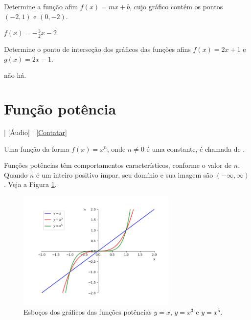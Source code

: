 \begin{ex}
  Determine a função afim $f(x)=mx+b$, cujo gráfico contém os pontos $(-2, 1)$ e $(0, -2)$.
\end{ex}
\begin{resp}
  $f(x) = -\frac{3}{2}x - 2$
\end{resp}

\begin{ex}
  Determine o ponto de interseção dos gráficos das funções afins $f(x) = 2x + 1$ e $g(x) = 2x -1$.
\end{ex}
\begin{resp}
  não há.
\end{resp}

\section{Função potência}\label{cap_funcao_sec_funpot}

\begin{flushright}
  [Vídeo] | [Áudio] | \href{https://phkonzen.github.io/notas/contato.html}{[Contatar]}
\end{flushright}

Uma função da forma $f(x)=x^n$, onde $n\neq 0$ é uma constante, é chamada de .

Funções potências têm comportamentos característicos, conforme o valor de $n$. Quando $n$ é um inteiro positivo ímpar, seu domínio e sua imagem são $(-\infty, \infty)$. Veja a Figura \ref{fig:funpot_impar}.

\begin{figure}[H]
  \centering
  \includegraphics[width=0.7\textwidth]{./cap_funcao/dados/fig_funpot_impar/fig_funpot_impar}
  \caption{Esboços dos gráficos das funções potências $y=x$, $y=x^3$ e $y=x^5$.}
  \label{fig:funpot_impar}
\end{figure}

